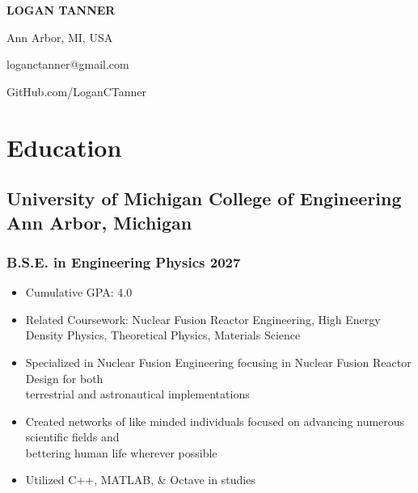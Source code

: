 \documentclass[10pt]{article} %
\begin{document}
\begin{center}
    \begin{minipage}{0.5\textwidth}
        {\huge\bfseries
            LOGAN TANNER 
        } \\ \medskip
    \end{minipage} \hfill
    \begin{minipage}{0.4\textwidth}
        \raggedleft
        \begin{description}[style=multiline, leftmargin=2cm]
            \item[Residence] Ann Arbor, MI, USA
            \item[Email] loganctanner@gmail.com
            \item[Mobile] 
            \item[GitHub] GitHub.com/LoganCTanner
        \end{description}
    \end{minipage}
\end{center}

\section{Education}
\subsection{University of Michigan College of Engineering \hfill Ann Arbor, Michigan}
\subsubsection{B.S.E. in Engineering Physics \hfill 2027}
\begin{itemize}
    \item {Cumulative GPA: 4.0}
    \item {Related Coursework: Nuclear Fusion Reactor Engineering, 
        High Energy Density Physics, Theoretical Physics, Materials Science} 
    \item {Specialized in Nuclear Fusion Engineering focusing in Nuclear 
        Fusion Reactor Design for both  \\ terrestrial and astronautical implementations}
    \item {Created networks of like minded individuals focused on advancing
        numerous scientific fields and \\ bettering human life wherever possible}
    \item {Utilized C++, MATLAB, \& Octave in studies}    
\end{itemize}
\end{document}
